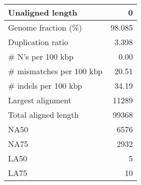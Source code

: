 \documentclass[12pt,a4paper]{article}
\begin{document}
\begin{table}[ht]
\begin{center}
\begin{tabular}{|l*{1}{|r}|}
Unaligned length & 0 \\ \hline
Genome fraction (\%) & 98.085 \\ \hline
Duplication ratio & 3.398 \\ \hline
\# N's per 100 kbp & 0.00 \\ \hline
\# mismatches per 100 kbp & 20.51 \\ \hline
\# indels per 100 kbp & 34.19 \\ \hline
Largest alignment & 11289 \\ \hline
Total aligned length & 99368 \\ \hline
NA50 & 6576 \\ \hline
NA75 & 2932 \\ \hline
LA50 & 5 \\ \hline
LA75 & 10 \\ \hline
\end{tabular}
\end{center}
\end{table}
\end{document}
